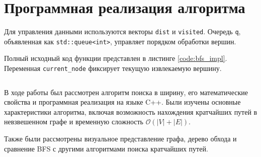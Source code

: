 \documentclass[coursework]{SCWorks}
\begin{document}
\section{Программная реализация алгоритма}

Для управления данными используются векторы
\texttt{dist} и \texttt{visited}. Очередь \texttt{q},
объявленная как \texttt{std::queue<int>}, управляет
порядком обработки вершин.

Полный исходный код функции представлен в листинге
\ref{code:bfs_impl}. Переменная
\texttt{current_node} фиксирует текущую
извлекаемую вершину.

\begin{listing}[H]
\caption{Реализация алгоритма BFS на языке C++}
\label{code:bfs_impl}
\inputminted{cpp}{bfs.cpp}
\end{listing}

\conclusion

В ходе работы был рассмотрен алгоритм поиска в ширину,
его математические свойства и программная реализация
на языке C++. Были изучены основные характеристики
алгоритма, включая возможность нахождения кратчайших
путей в невзвешенном графе и временную сложность
$\mathcal{O}(|V| + |E|)$.

Также были рассмотрены визуальное представление графа,
дерево обхода и сравнение BFS с другими алгоритмами
поиска кратчайших путей.




\appendix
\end{document}
